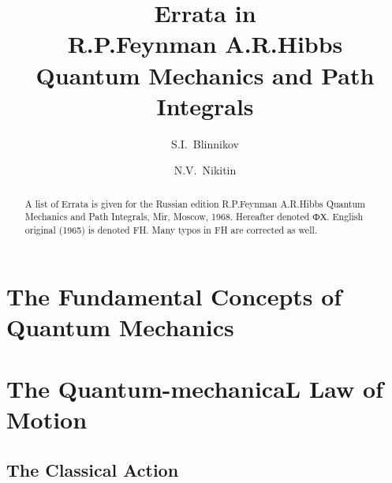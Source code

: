 \documentclass[11pt,a4paper]{report}
\begin{document}
\title{Errata in \\
R.P.Feynman A.R.Hibbs \\
Quantum Mechanics and Path Integrals}

\author[1,2,3]{S.I.~Blinnikov}

\author[4]{N.V.~Nikitin}



\maketitle

\begin{abstract}
A list of Errata is given for the Russian edition R.P.Feynman A.R.Hibbs Quantum Mechanics and
Path Integrals, Mir, Moscow, 1968. Hereafter denoted ФХ.
English original (1965) is denoted FH. Many typos in FH are corrected as well.

\end{abstract}



\chapter{The Fundamental Concepts of Quantum Mechanics}

\chapter{The Quantum-mechanicaL Law of Motion}

\section{The Classical Action}
\end{document}
